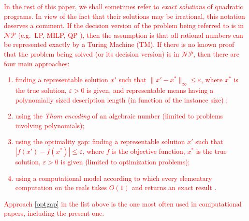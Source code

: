 \textcolor{red}{In the rest of this paper, we shall sometimes refer to {\it exact solutions} of quadratic programs. In view of the fact that their solutions may be irrational, this notation deserves a comment. If the decision version of the problem being referred to is in $\mathcal{NP}$ (e.g.~LP, MILP, QP \cite{vavasis90a}), then the assumption is that all rational numbers can be represented exactly by a Turing Machine (TM). 
If there is no known proof that the problem being solved (or its decision version) is in $\mathcal{NP}$, then there are four main approaches:
\begin{enumerate}
\item finding a representable solution $x'$ such that $\|x'-x^\ast\|_\infty\le\varepsilon$, where $x^\ast$ is the true solution, $\varepsilon>0$ is given, and representable means having a polynomially sized description length
(in function of the instance size) \cite{hochbaum2};
\item using the {\it Thom encoding} of an algebraic number \cite[Prop.~2.28]{pollack} (limited to problems involving polynomials);
\item using the optimality gap: finding a representable solution $x'$ such that $|f(x')-f(x^\ast)|\le\varepsilon$, where $f$ is the objective function, $x^\ast$ is the true solution, $\varepsilon>0$ is given
(limited to optimization problems);\label{optgap}
\item using a computational model according to which every elementary computation on the reals takes $O(1)$ and returns an exact result \cite[p.~24]{blum}.
\end{enumerate}
Approach \ref{optgap} in the list above is the one most often used in computational papers, including the present one.}


